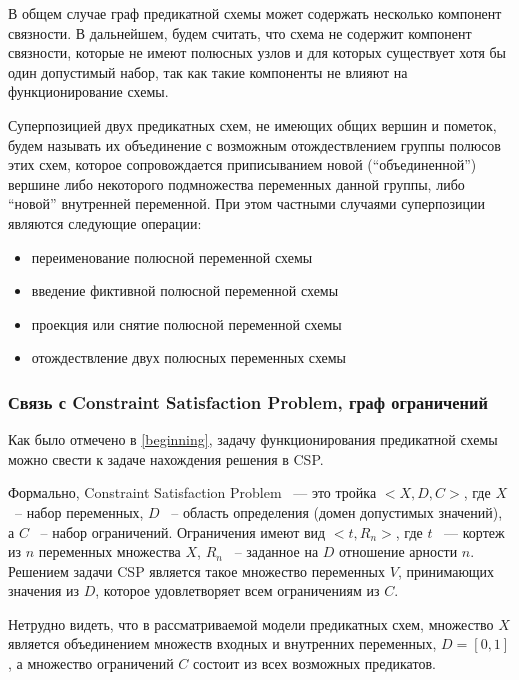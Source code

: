 \documentclass[12pt]{article}
\begin{document}
В общем случае граф предикатной схемы может содержать несколько компонент связности. 
В дальнейшем, будем считать, что схема не содержит компонент связности, 
которые не имеют полюсных узлов и для которых существует хотя бы один допустимый набор, так как такие компоненты не влияют на функционирование схемы.

Суперпозицией двух предикатных схем, не имеющих общих вершин и пометок, 
будем называть их объединение с возможным отождествлением группы полюсов этих схем, 
которое сопровождается приписыванием новой (``объединенной'') вершине либо некоторого подмножества переменных данной группы, либо ``новой'' внутренней переменной.
 При этом частными случаями суперпозиции являются следующие операции:
\begin{itemize}
\item переименование полюсной переменной схемы

\item введение фиктивной полюсной переменной схемы

\item проекция или снятие полюсной переменной схемы

\item отождествление двух полюсных переменных схемы
\end{itemize}

\subsubsection*{Связь с Constraint Satisfaction Problem, граф ограничений}
Как было отмечено в \ref{beginning}, задачу функционирования предикатной схемы можно свести к задаче нахождения решения в CSP. 

Формально, Constraint Satisfaction Problem ~--- это тройка $<X,D,C>$, где $X$ ~-- набор переменных, $D$ ~-- область определения (домен допустимых значений), 
а $C$ ~-- набор ограничений. Ограничения имеют вид $<t, R_n>$, где $t$ ~--- кортеж из $n$ переменных множества $X$, 
$R_n$ ~-- заданное на $D$ отношение арности $n$. Решением задачи CSP является такое множество переменных $V$, принимающих значения из $D$, 
которое удовлетворяет всем ограничениям из $C$. 

Нетрудно видеть, что в рассматриваемой модели предикатных схем, множество $X$ является объединением множеств входных и внутренних переменных, $D=[0,1]$,
а множество ограничений $C$ состоит из всех возможных предикатов.
\end{document}
